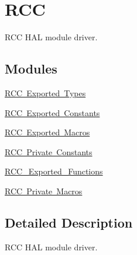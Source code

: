 \hypertarget{group___r_c_c}{}\section{R\+CC}
\label{group___r_c_c}


R\+CC H\+AL module driver.  


\subsection*{Modules}
\begin{DoxyCompactItemize}
\item 
\mbox{\hyperlink{group___r_c_c___exported___types}{R\+C\+C Exported Types}}
\item 
\mbox{\hyperlink{group___r_c_c___exported___constants}{R\+C\+C Exported Constants}}
\item 
\mbox{\hyperlink{group___r_c_c___exported___macros}{R\+C\+C Exported Macros}}
\item 
\mbox{\hyperlink{group___r_c_c___private___constants}{R\+C\+C Private Constants}}
\item 
\mbox{\hyperlink{group___r_c_c___exported___functions}{R\+C\+C\+\_\+\+Exported\+\_\+\+Functions}}
\item 
\mbox{\hyperlink{group___r_c_c___private___macros}{R\+C\+C Private Macros}}
\end{DoxyCompactItemize}


\subsection{Detailed Description}
R\+CC H\+AL module driver. 

